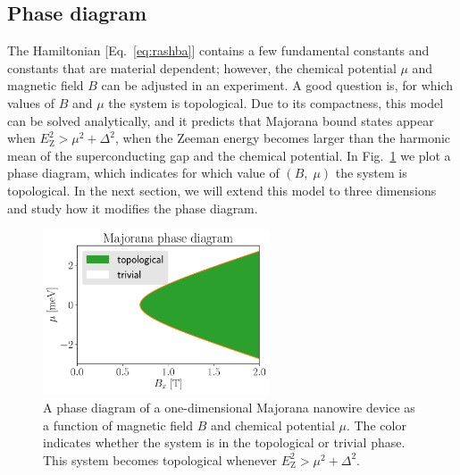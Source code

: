\subsection{Phase diagram}\label{sec:phase_diagram_1D_intro}
The Hamiltonian [Eq.~\eqref{eq:rashba}] contains a few fundamental constants and constants that are material dependent; however, the chemical potential $\mu$ and magnetic field $B$ can be adjusted in an experiment.
A good question is, for which values of $B$ and $\mu$ the system is topological.
Due to its compactness, this model can be solved analytically, and it predicts that Majorana bound states appear when $E_\textrm{Z}^{2}>\mu^{2}+\Delta^{2}$, when the Zeeman energy becomes larger than the harmonic mean of the superconducting gap and the chemical potential.
In Fig.~\ref{fig:phase_diagram_1D} we plot a phase diagram, which indicates for which value of $\left(B,\; \mu\right)$ the system is topological.
In the next section, we will extend this model to three dimensions and study how it modifies the phase diagram.

\begin{figure}
\begin{center}
\includegraphics[width=0.6\textwidth]{chapter_introduction/figures/phase_diagram_1D.pdf}
\caption{A phase diagram of a one-dimensional Majorana nanowire device as a function of magnetic field $B$ and chemical potential $\mu$.
The color indicates whether the system is in the topological or trivial phase.
This system becomes topological whenever $E_\textrm{Z}^{2}>\mu^{2}+\Delta^{2}$.
\label{fig:phase_diagram_1D}}
\end{center}
\end{figure}




